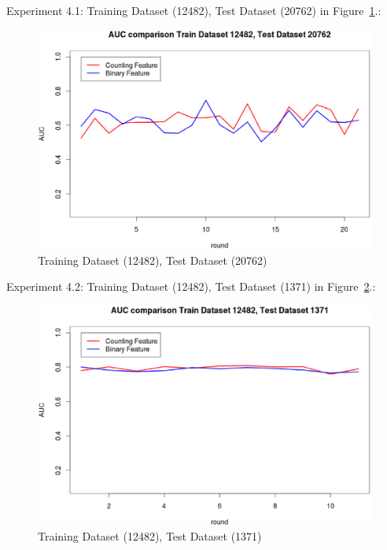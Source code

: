 \documentclass{sig-alternate}
\begin{document}
Experiment 4.1: Training Dataset  (12482), Test Dataset  (20762) in Figure~\ref{fig:fig9}.:
\begin{figure}[h]
\centering
\includegraphics[width=\columnwidth]{12482_20762.eps}
\caption{Training Dataset  (12482), Test Dataset  (20762)}
\label{fig:fig9}
\end{figure}

Experiment 4.2: Training Dataset  (12482), Test Dataset  (1371) in Figure~\ref{fig:fig10}.:
\begin{figure}[h]
\centering
\includegraphics[width=\columnwidth]{12482_1371.eps}
\caption{Training Dataset  (12482), Test Dataset  (1371)}
\label{fig:fig10}
\end{figure}
\end{document}
